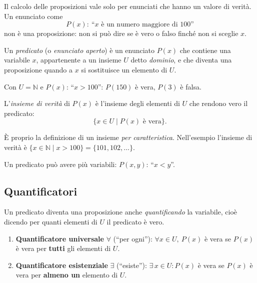 \documentclass[11pt,a4paper]{article}
\begin{document}
Il calcolo delle proposizioni vale solo per enunciati che hanno un valore
di verità. Un enunciato come
\[
P(x):\ \text{``$x$ è un numero maggiore di $100$''}
\]
non è una proposizione: non si può dire se è vero o falso finché non si
sceglie $x$.

\begin{definizione}
Un \emph{predicato} (o \emph{enunciato aperto}) è un enunciato $P(x)$ che
contiene una variabile $x$, appartenente a un insieme $U$ detto
\emph{dominio}, e che diventa una proposizione quando a $x$ si sostituisce
un elemento di $U$.
\end{definizione}

\begin{esempio}
Con $U = \mathbb{N}$ e $P(x)$: ``$x > 100$'': $P(150)$ è vera,
$P(3)$ è falsa.
\end{esempio}

\begin{definizione}
L'\emph{insieme di verità} di $P(x)$ è l'insieme degli elementi di $U$ che
rendono vero il predicato:
\[
\{x \in U \mid P(x) \text{ è vera}\}.
\]
\end{definizione}

È proprio la definizione di un insieme \emph{per caratteristica}. Nell'esempio
l'insieme di verità è $\{x \in \mathbb{N} \mid x > 100\} = \{101, 102, \dots\}$.

Un predicato può avere più variabili: $P(x, y)$: ``$x < y$''.

\subsection{Quantificatori}

Un predicato diventa una proposizione anche \emph{quantificando} la
variabile, cioè dicendo per quanti elementi di $U$ il predicato è vero.

\begin{definizione}
\begin{enumerate}
    \item \textbf{Quantificatore universale} $\forall$ (``per ogni''):
          $\forall x \in U,\ P(x)$ è vera se $P(x)$ è vera per
          \textbf{tutti} gli elementi di $U$.
    \item \textbf{Quantificatore esistenziale} $\exists$ (``esiste''):
          $\exists\, x \in U : P(x)$ è vera se $P(x)$ è vera per
          \textbf{almeno un} elemento di $U$.
\end{enumerate}
\end{definizione}
\end{document}
